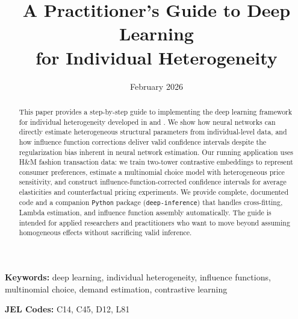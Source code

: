 \documentclass[11pt]{article}
\title{\textbf{A Practitioner's Guide to Deep Learning\\for Individual Heterogeneity}}
\author{}
\date{February 2026}
\begin{document}
\maketitle

\begin{abstract}
This paper provides a step-by-step guide to implementing the deep learning framework for individual heterogeneity developed in \citet{farrell2021deep} and \citet{farrell2025deep}. We show how neural networks can directly estimate heterogeneous structural parameters from individual-level data, and how influence function corrections deliver valid confidence intervals despite the regularization bias inherent in neural network estimation. Our running application uses H\&M fashion transaction data: we train two-tower contrastive embeddings to represent consumer preferences, estimate a multinomial choice model with heterogeneous price sensitivity, and construct influence-function-corrected confidence intervals for average elasticities and counterfactual pricing experiments. We provide complete, documented code and a companion \texttt{Python} package (\texttt{deep-inference}) that handles cross-fitting, Lambda estimation, and influence function assembly automatically. The guide is intended for applied researchers and practitioners who want to move beyond assuming homogeneous effects without sacrificing valid inference.
\end{abstract}

\bigskip
\noindent\textbf{Keywords:} deep learning, individual heterogeneity, influence functions, multinomial choice, demand estimation, contrastive learning

\bigskip
\noindent\textbf{JEL Codes:} C14, C45, D12, L81

\newpage
\tableofcontents
\newpage












\newpage
\appendix

\end{document}
